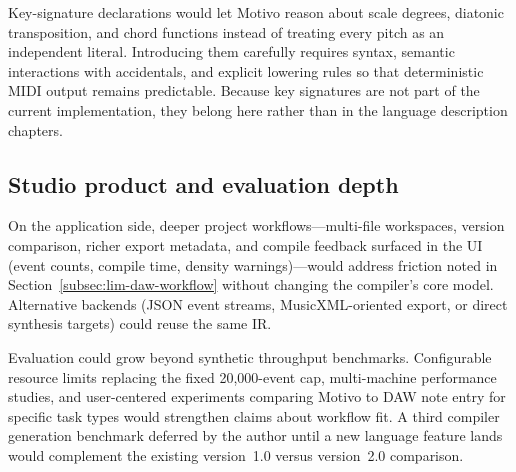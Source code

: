 Key-signature declarations would let Motivo reason about scale degrees, diatonic transposition, and chord functions
instead of treating every pitch as an independent literal.
Introducing them carefully requires syntax, semantic interactions with accidentals, and explicit lowering rules so
that deterministic MIDI output remains predictable.
Because key signatures are not part of the current implementation, they belong here rather than in the language
description chapters.

\subsection{Studio product and evaluation depth}\label{subsec:fw-studio-eval}

On the application side, deeper project workflows---multi-file workspaces, version comparison, richer export metadata,
and compile feedback surfaced in the UI (event counts, compile time, density warnings)---would address friction noted
in Section~\ref{subsec:lim-daw-workflow} without changing the compiler's core model.
Alternative backends (JSON event streams, MusicXML-oriented export, or direct synthesis targets) could reuse
the same IR.

Evaluation could grow beyond synthetic throughput benchmarks.
Configurable resource limits replacing the fixed 20,000-event cap, multi-machine performance studies, and user-centered
experiments comparing Motivo to DAW note entry for specific task types would strengthen claims about workflow fit.
A third compiler generation benchmark deferred by the author until a new language feature lands would complement the
existing version~1.0 versus version~2.0 comparison.
